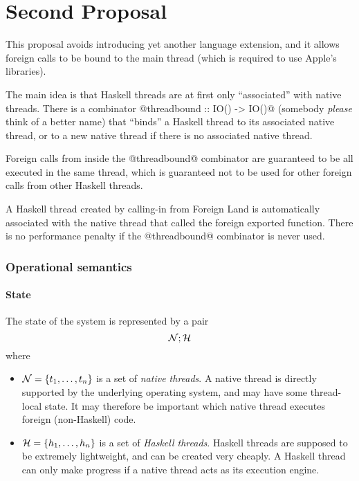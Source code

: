 \documentclass{article}
\newcommand{\NS}{{\cal N}}
\newcommand{\HS}{{\cal H}}
\begin{document}
\part{Second Proposal}

This proposal avoids introducing yet another language extension, and it allows
foreign calls to be bound to the main thread (which is required to use Apple's
libraries).

The main idea is that Haskell threads are at first only ``associated'' with
native threads. There is a combinator @threadbound :: IO() -> IO()@ (somebody
\emph{please} think of a better name) that ``binds'' a Haskell thread to its
associated native thread, or to a new native thread if there is no associated
native thread.

Foreign calls from inside the @threadbound@ combinator are guaranteed to be all
executed in the same thread, which is guaranteed not to be used for other
foreign calls from other Haskell threads.

A Haskell thread created by calling-in from Foreign Land is automatically
associated with the native thread that called the foreign exported function.
There is no performance penalty if the @threadbound@ combinator is never used.

\section{Operational semantics}

\subsection{State}

The state of the system is represented by a pair
$$\NS ; \HS$$
where 
\begin{itemize}
\item $\NS = \{t_1, \ldots ,t_n\}$ is a set of \emph{native threads}.
A native thread is directly supported by the underlying operating
system, and may have some thread-local state. It may therefore
be important which native thread executes foreign
(non-Haskell) code.

\item $\HS = \{h_1, \ldots ,h_n\}$ is a set of \emph{Haskell threads}.
Haskell threads are supposed to be extremely lightweight, and
can be created very cheaply. A Haskell thread can only make progress
if a native thread acts as its execution engine.
\end{itemize}
\end{document}
